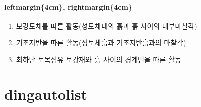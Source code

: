 		\paragraph{ leftmargin\{4cm\}, rightmargin\{4cm\} } 
			\begin{enumerate}[leftmargin=4cm, rightmargin=4cm]
			\item	보강토체를 따른 활동(성토체내의 흙과 흙 사이의 내부마찰각) 
			\item	기초지반을 따른 활동(성토체흙과 기초지반흙과의 마찰각) 
			\item	최하단 토목섬유 보강재와 흙 사이의 경계면을 따른 활동 
			\end{enumerate}




	\section{dingautolist}

